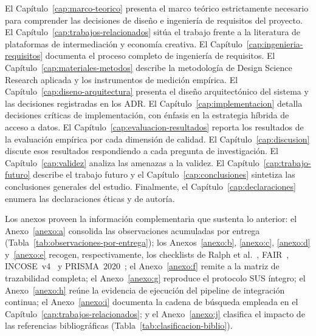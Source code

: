El Capítulo~\ref{cap:marco-teorico} presenta el marco teórico
estrictamente necesario para comprender las decisiones de diseño e
ingeniería de requisitos del proyecto. El Capítulo~\ref{cap:trabajos-relacionados}
sitúa el trabajo frente a la literatura de plataformas de intermediación y
economía creativa. El Capítulo~\ref{cap:ingenieria-requisitos} documenta el
proceso completo de ingeniería de requisitos. El
Capítulo~\ref{cap:materiales-metodos} describe la metodología de Design
Science Research aplicada y los instrumentos de medición empírica. El
Capítulo~\ref{cap:diseno-arquitectura} presenta el diseño arquitectónico
del sistema y las decisiones registradas en los ADR. El
Capítulo~\ref{cap:implementacion} detalla decisiones críticas de
implementación, con énfasis en la estrategia híbrida de acceso a datos. El
Capítulo~\ref{cap:evaluacion-resultados} reporta los resultados de la
evaluación empírica por cada dimensión de calidad. El
Capítulo~\ref{cap:discusion} discute esos resultados respondiendo a cada
pregunta de investigación. El Capítulo~\ref{cap:validez} analiza las
amenazas a la validez. El Capítulo~\ref{cap:trabajo-futuro} describe el
trabajo futuro y el Capítulo~\ref{cap:conclusiones} sintetiza las
conclusiones generales del estudio. Finalmente, el
Capítulo~\ref{cap:declaraciones} enumera las declaraciones éticas y de
autoría.

Los anexos proveen la información complementaria que sustenta lo anterior:
el Anexo~\ref{anexo:a} consolida las observaciones acumuladas por entrega
(Tabla~\ref{tab:observaciones-por-entrega}); los
Anexos~\ref{anexo:b}, \ref{anexo:c}, \ref{anexo:d} y~\ref{anexo:e}
recogen, respectivamente, los checklists de Ralph et
al.~\cite{RALPH2021}, FAIR~\cite{WILKINSON2016},
INCOSE~v4~\cite{INCOSE2023} y PRISMA~2020~\cite{PRISMA2021}; el
Anexo~\ref{anexo:f} remite a la matriz de trazabilidad completa; el
Anexo~\ref{anexo:g} reproduce el protocolo SUS íntegro; el
Anexo~\ref{anexo:h} reúne la evidencia de ejecución del pipeline de
integración continua; el Anexo~\ref{anexo:i} documenta la cadena de
búsqueda empleada en el Capítulo~\ref{cap:trabajos-relacionados}; y el
Anexo~\ref{anexo:j} clasifica el impacto de las referencias
bibliográficas (Tabla~\ref{tab:clasificacion-biblio}).
